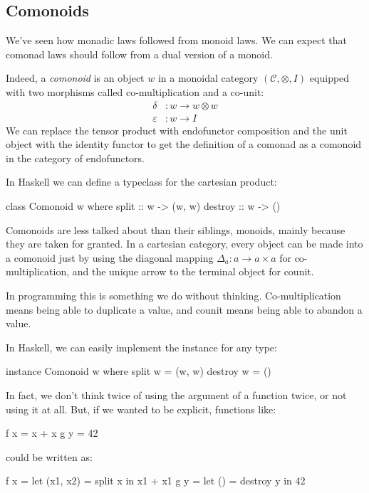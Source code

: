 \documentclass[DaoFP]{subfiles}
\begin{document}
\subsection{Comonoids}

We've seen how monadic laws followed from monoid laws. We can expect that comonad laws should follow from a dual version of a monoid. 

Indeed, a \emph{comonoid} is an object $w$ in a monoidal category $(\mathcal{C}, \otimes, I)$ equipped with two morphisms called co-multiplication and a co-unit:
\begin{align*}
\delta &\colon w \to w \otimes w \\
\varepsilon &\colon w \to I
\end{align*}
We can replace the tensor product with endofunctor composition and the unit object with the identity functor to get the definition of a comonad as a comonoid in the category of endofunctors.

In Haskell we can define a  typeclass for the cartesian product:
\begin{haskell}
class Comonoid w where
  split   :: w -> (w, w)
  destroy :: w -> ()
\end{haskell}

Comonoids are less talked about than their siblings, monoids, mainly because they are taken for granted. In a cartesian category, every object can be made into a comonoid just by using the diagonal mapping $\Delta_a \colon a \to a \times a$ for co-multiplication, and the unique arrow to the terminal object for counit.

In programming this is something we do without thinking. Co-multiplication means being able to duplicate a value, and counit means being able to abandon a value. 

In Haskell, we can easily implement the  instance for any type:
\begin{haskell}
instance Comonoid w where
  split w   = (w, w)
  destroy w = ()
\end{haskell}
In fact, we don't think twice of using the argument of a function twice, or not using it at all. But, if we wanted to be explicit, functions like:
\begin{haskell}
f x = x + x
g y = 42
\end{haskell}
could be written as:
\begin{haskell}
f x = let (x1, x2) = split x 
      in x1 + x1
g y = let () = destroy y 
      in 42
\end{haskell}
\end{document}
